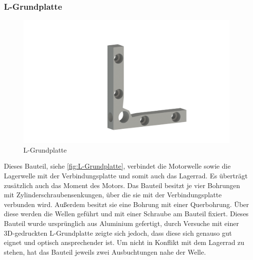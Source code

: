 \subsubsection{L-Grundplatte}
\begin{figure}
    \includegraphics[width=8 cm]{fig/mech/L_Grundplatte}
    \caption{L-Grundplatte}
    \label{fig:L-Grundplatte}
\end{figure}
Dieses Bauteil, siehe \autoref{fig:L-Grundplatte}, verbindet die Motorwelle sowie die Lagerwelle mit der Verbindungsplatte und somit auch das Lagerrad.
Es überträgt zusätzlich auch das Moment des Motors.
Das Bauteil besitzt je vier Bohrungen mit Zylinderschraubensenkungen, über die sie mit
der Verbindungsplatte verbunden wird.
Außerdem besitzt sie eine Bohrung mit einer Querbohrung.
Über diese werden die Wellen geführt und mit einer Schraube am Bauteil fixiert.
Dieses Bauteil wurde ursprünglich aus Aluminium gefertigt, durch Versuche mit einer 3D-gedruckten L-Grundplatte zeigte
sich jedoch, dass diese sich genauso gut eignet und optisch ansprechender ist.
Um nicht in Konflikt mit dem Lagerrad zu stehen, hat das Bauteil jeweils zwei Ausbuchtungen nahe der Welle.

